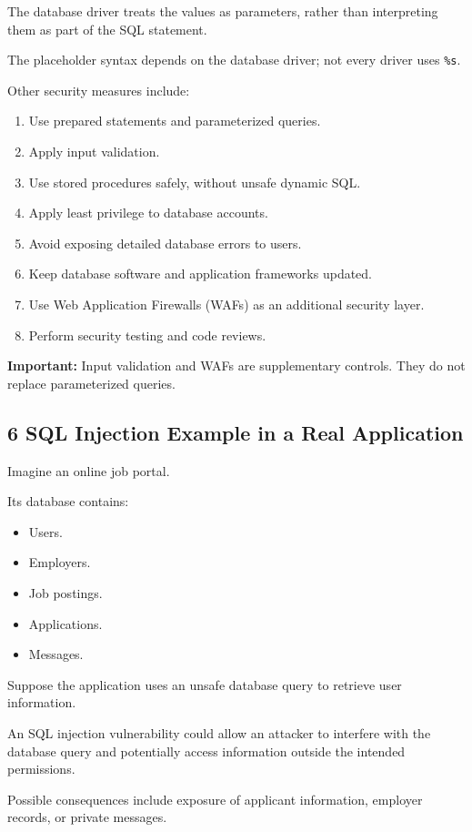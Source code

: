 The database driver treats the values as parameters, rather than interpreting them as part of the SQL statement.

The placeholder syntax depends on the database driver; not every driver uses \texttt{\%s}.

Other security measures include:

\begin{enumerate}
\item Use prepared statements and parameterized queries.
\item Apply input validation.
\item Use stored procedures safely, without unsafe dynamic SQL.
\item Apply least privilege to database accounts.
\item Avoid exposing detailed database errors to users.
\item Keep database software and application frameworks updated.
\item Use Web Application Firewalls (WAFs) as an additional security layer.
\item Perform security testing and code reviews.
\end{enumerate}

\textbf{Important:} Input validation and WAFs are supplementary controls. They do not replace parameterized queries.

\subsection{6 SQL Injection Example in a Real Application}

Imagine an online job portal.

Its database contains:

\begin{itemize}
\item Users.
\item Employers.
\item Job postings.
\item Applications.
\item Messages.
\end{itemize}

Suppose the application uses an unsafe database query to retrieve user information.

An SQL injection vulnerability could allow an attacker to interfere with the database query and potentially access information outside the intended permissions.

Possible consequences include exposure of applicant information, employer records, or private messages.

